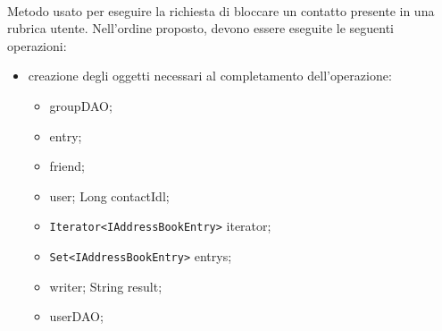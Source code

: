 \begin{description}
	\item{}\\	
	Metodo usato per eseguire la richiesta di bloccare un contatto presente in una rubrica utente. Nell'ordine proposto, devono essere eseguite le seguenti operazioni:
	\begin{itemize}
		\item creazione degli oggetti necessari al completamento dell'operazione:
		\begin{itemize}
			\item {} groupDAO;
			\item {} entry;
			\item {} friend;
			\item {} user;
			Long contactIdl;
			\item \texttt{Iterator<IAddressBookEntry>} iterator;
			\item \texttt{Set<IAddressBookEntry>} entrys;
			\item {} writer;
			String result;
			\item {} userDAO;
		\end{itemize}
		

\end{itemize}
\end{description}
